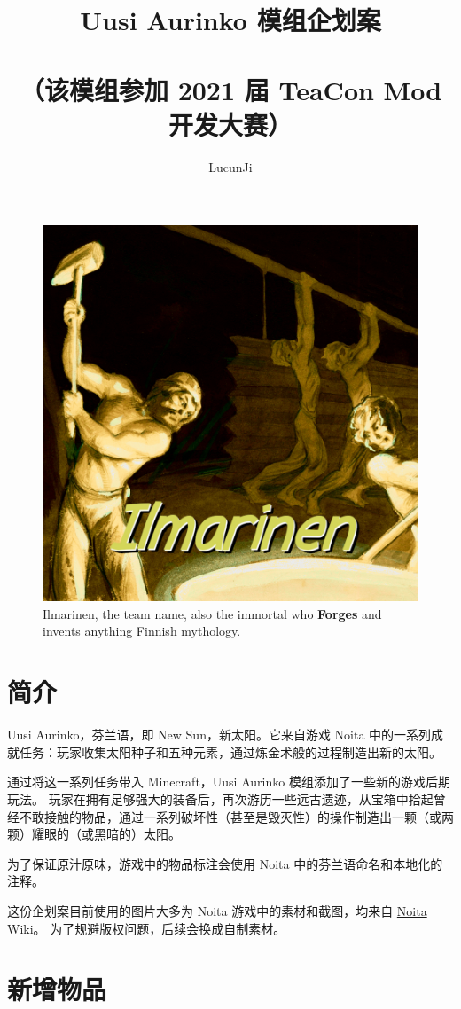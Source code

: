 \documentclass[11pt]{article}
\title{Uusi Aurinko 模组企划案\\
\ \\
\small{（该模组参加 2021 届 TeaCon Mod 开发大赛）}}
\author{LucunJi}
\begin{document}
    \maketitle
    \begin{figure}[ht!]
        \centering
        \includegraphics[width=.5\textwidth]{../Ilmarinen}
        \caption{Ilmarinen, the team name, also the immortal who \textbf{Forges} and invents anything Finnish mythology.}
        \label{fig:group}
    \end{figure}

    \clearpage
    \tableofcontents

    \clearpage
    \section{简介}\label{sec:intro}
    Uusi Aurinko，芬兰语，即 New Sun，新太阳。它来自游戏 Noita 中的一系列成就任务：玩家收集太阳种子和五种元素，通过炼金术般的过程制造出新的太阳。

    通过将这一系列任务带入 Minecraft，Uusi Aurinko 模组添加了一些新的游戏后期玩法。
    玩家在拥有足够强大的装备后，再次游历一些远古遗迹，从宝箱中拾起曾经不敢接触的物品，通过一系列破坏性（甚至是毁灭性）的操作制造出一颗（或两颗）耀眼的（或黑暗的）太阳。

    为了保证原汁原味，游戏中的物品标注会使用 Noita 中的芬兰语命名和本地化的注释。

    \vspace{1em}
    这份企划案目前使用的图片大多为 Noita 游戏中的素材和截图，均来自 \href{https://noita.fandom.com/wiki/Noita_Wiki}{Noita Wiki}。
    为了规避版权问题，后续会换成自制素材。

    \clearpage
    \section{新增物品}\label{sec:new-items}
\end{document}
